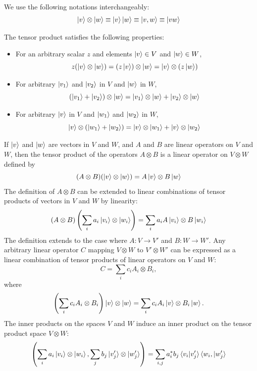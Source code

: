 We use the following notations interchangeably:
\[
    \ket{v} \otimes \ket{w} \equiv \ket{v}\ket{w} \equiv \ket{v,w} \equiv  \ket{vw}
\]

The tensor product satisfies the following properties:
\begin{itemize}
    \item For an arbitrary scalar $z$ and elements $\ket{v}\in V$ and $\ket{w} \in W$,
        \[
            z(\ket{v} \otimes \ket{w}) = (z\ket{v}) \otimes \ket{w} = \ket{v} \otimes (z\ket{w})
        \]
    \item For arbitrary $\ket{v_1}$ and $\ket{v_2}$ in $V$ and $\ket{w}$ in $W$,
        \[
            (\ket{v_1} + \ket{v_2}) \otimes \ket{w} = \ket{v_1} \otimes \ket{w} + \ket{v_2} \otimes \ket{w}
        \]
    \item For arbitrary $\ket{v}$ in $V$ and $\ket{w_1}$ and $\ket{w_2}$ in $W$,
        \[
            \ket{v} \otimes (\ket{w_1} + \ket{w_2}) = \ket{v} \otimes \ket{w_1} + \ket{v} \otimes \ket{w_2}
        \]
\end{itemize}

If $\ket{v}$ and $\ket{w}$ are vectors in $V$ and $W$,
and $A$ and $B$ are linear operators on $V$ and $W$,
then the tensor product of the operators $A \otimes B$ is a linear operator on $V \otimes W$ defined by 
\[
    (A \otimes B)(\ket{v} \otimes \ket{w}) = A\ket{v} \otimes B\ket{w}
\]
The definition of $A \otimes B$ can be extended to linear combinations of tensor products of vectors in $V$ and $W$ by linearity:
\[
    (A \otimes B)\left(\sum_{i} a_{i} \ket{v_i} \otimes \ket{w_i}\right) = \sum_{i} a_{i} A\ket{v_i} \otimes B\ket{w_i}
\]
The definition extends to the case where $A\colon V \to V'$ and $B\colon W \to W'$.
Any arbitrary linear operator $C$ mapping $V \otimes W$ to $V' \otimes W'$ can be expressed as a linear combination of tensor products of linear operators on $V$ and $W$:
\[
    C = \sum_i c_i A_i \otimes B_i,
\]
where
\[
    \left( \sum_i c_i A_i \otimes B_i \right) \ket{v} \otimes \ket{w} = \sum_i c_i A_i\ket{v} \otimes B_i\ket{w}.
\]
The inner products on the spaces $V$ and $W$ induce an inner product on the tensor product space $V \otimes W$:
\[
    \left( \sum_i a_i \ket{v_i} \otimes \ket{w_i}, \sum_j b_j \ket{v_j'} \otimes \ket{w_j'} \right) = \sum_{i,j} a_i^* b_j \braket{v_i|v_j'}\braket{w_i,|w_j'}
\]


